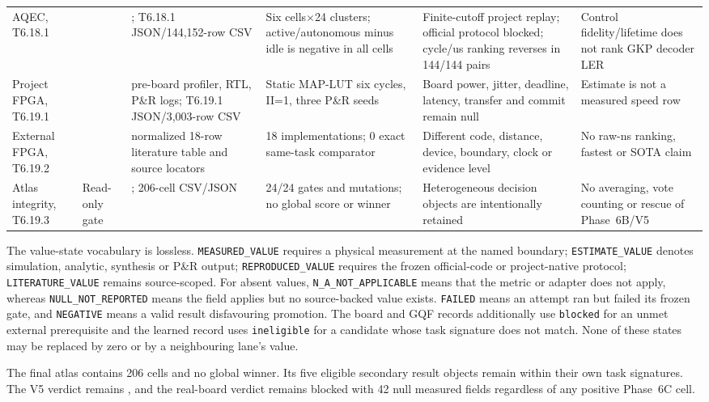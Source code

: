 \documentclass[11pt]{article}
\begin{document}
{\begin{longtable}{@{}L{0.13\textwidth} L{0.15\textwidth} L{0.17\textwidth} L{0.18\textwidth} L{0.16\textwidth} L{0.12\textwidth}@{}}
AQEC, T6.18.1 &  & ; T6.18.1 JSON/144,152-row CSV & Six cells$\times$24 clusters; active/autonomous minus idle is negative in all cells & Finite-cutoff project replay; official protocol blocked; cycle/us ranking reverses in 144/144 pairs & Control fidelity/lifetime does not rank GKP decoder LER \\
Project FPGA, T6.19.1 &  & pre-board profiler, RTL, P\&R logs; T6.19.1 JSON/3,003-row CSV & Static MAP-LUT six cycles, II=1, three P\&R seeds & Board power, jitter, deadline, latency, transfer and commit remain null & Estimate is not a measured speed row \\
External FPGA, T6.19.2 &  & normalized 18-row literature table and source locators & 18 implementations; 0 exact same-task comparator & Different code, distance, device, boundary, clock or evidence level & No raw-ns ranking, fastest or SOTA claim \\
Atlas integrity, T6.19.3 & Read-only gate & ; 206-cell CSV/JSON & 24/24 gates and mutations; no global score or winner & Heterogeneous decision objects are intentionally retained & No averaging, vote counting or rescue of Phase~6B/V5 \\
\bottomrule
\end{longtable}
}

The value-state vocabulary is lossless.  \texttt{MEASURED\_VALUE} requires a
physical measurement at the named boundary; \texttt{ESTIMATE\_VALUE} denotes
simulation, analytic, synthesis or P\&R output; \texttt{REPRODUCED\_VALUE}
requires the frozen official-code or project-native protocol;
\texttt{LITERATURE\_VALUE} remains source-scoped.  For absent values,
\texttt{N\_A\_NOT\_APPLICABLE} means that the metric or adapter does not apply,
whereas \texttt{NULL\_NOT\_REPORTED} means the field applies but no source-backed
value exists.  \texttt{FAILED} means an attempt ran but failed its frozen gate,
and \texttt{NEGATIVE} means a valid result disfavouring promotion.  The board
and GQF records additionally use \texttt{blocked} for an unmet external
prerequisite and the learned record uses \texttt{ineligible} for a candidate
whose task signature does not match.  None of these states may be replaced by
zero or by a neighbouring lane's value.

The final atlas contains 206 cells and no global winner.  Its five eligible
secondary result objects remain within their own task signatures.  The V5
verdict remains , and the real-board verdict
remains blocked with 42 null measured fields regardless of any positive
Phase~6C cell.
\end{document}
